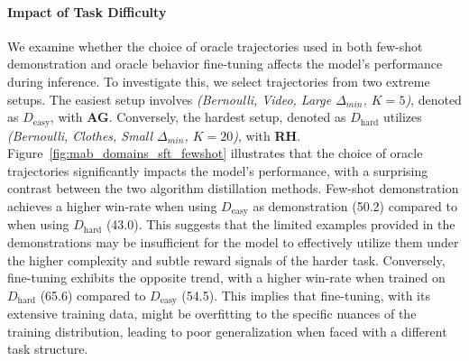 \documentclass[11pt, logo]{googledeepmind}
\newcommand{\RH}{\textbf{RH}\xspace}
\newcommand{\AG}{\textbf{AG}\xspace}
\newcommand{\ad}{algorithm distillation\xspace}
\theoremstyle{plain}
\theoremstyle{definition}
\begin{document}
\paragraph{Impact of Task Difficulty}
We examine whether the choice of oracle trajectories used in both few-shot demonstration and oracle behavior fine-tuning affects the model's performance during inference. To investigate this, we select trajectories from two extreme setups. The easiest setup involves \emph{(Bernoulli, Video, Large $\Delta_{min}$, $K=5$)}, denoted as $D_{\text{easy}}$, with \AG. Conversely, the hardest setup, denoted as $D_{\text{hard}}$ utilizes \emph{(Bernoulli, Clothes, Small $\Delta_{min}$, $K=20$)}, with \RH.
Figure~\ref{fig:mab_domains_sft_fewshot} illustrates that the choice of oracle trajectories significantly impacts the model's performance, with a surprising contrast between the two \ad methods.
Few-shot demonstration achieves a higher win-rate when using $D_{\text{easy}}$ as demonstration (50.2) compared to when using $D_{\text{hard}}$ (43.0). This suggests that the limited examples provided in the demonstrations may be insufficient for the model to effectively utilize them under the higher complexity and subtle reward signals of the harder task.
Conversely, fine-tuning exhibits the opposite trend, with a higher win-rate when trained on $D_{\text{hard}}$ (65.6) compared to $D_{\text{easy}}$ (54.5).
This implies that fine-tuning, with its extensive training data, might be overfitting to the specific nuances of the training distribution, leading to poor generalization when faced with a different task structure.
\end{document}
